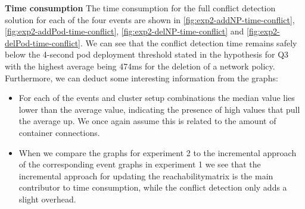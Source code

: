 \textbf{Time consumption}
\newline The time consumption for the full conflict detection solution for each of the four events are shown in \autoref{fig:exp2-addNP-time-conflict}, \autoref{fig:exp2-addPod-time-conflict}, \autoref{fig:exp2-delNP-time-conflict} and \autoref{fig:exp2-delPod-time-conflict}.  We can see that the conflict detection time remains safely below the 4-second pod deployment threshold stated in the hypothesis for Q3 with the highest average being 474ms for the deletion of a network policy. Furthermore, we can deduct some interesting information from the graphs:
\begin{itemize}
    \item For each of the events and cluster setup combinations the median value lies lower than the average value, indicating the presence of high values that pull the average up. We once again assume this is related to the amount of container connections.
    \item When we compare the graphs for experiment 2 to the incremental approach of the corresponding event graphs in experiment 1 we see that the incremental approach for updating the reachabilitymatrix is the main contributor to time consumption, while the conflict detection only adds a slight overhead.
\end{itemize}

